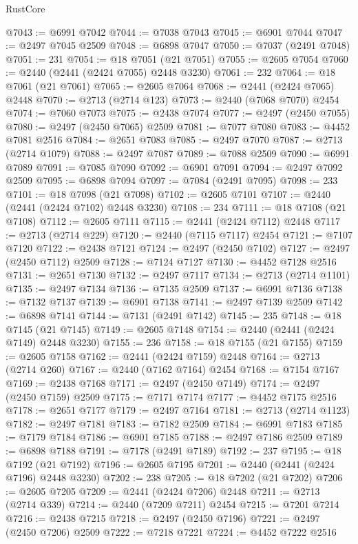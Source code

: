 \begin{lexlean}{RustCore}
\begin{coremodule}
@7043 := @6991 @7042
@7044 := @7038 @7043
@7045 := @6901 @7044
@7047 := @2497 @7045 @2509
@7048 := @6898 @7047
@7050 := @7037 (@2491 @7048)
@7051 := 231
@7054 := @18 @7051 (@21 @7051)
@7055 := @2605 @7054
@7060 := @2440 (@2441 (@2424 @7055) @2448 @3230)
@7061 := 232
@7064 := @18 @7061 (@21 @7061)
@7065 := @2605 @7064
@7068 := @2441 (@2424 @7065) @2448
@7070 := @2713 (@2714 @123)
@7073 := @2440 (@7068 @7070) @2454
@7074 := @7060 @7073
@7075 := @2438 @7074
@7077 := @2497 (@2450 @7055)
@7080 := @2497 (@2450 @7065) @2509
@7081 := @7077 @7080
@7083 := @4452 @7081 @2516
@7084 := @2651 @7083
@7085 := @2497 @7070
@7087 := @2713 (@2714 @1079)
@7088 := @2497 @7087
@7089 := @7088 @2509
@7090 := @6991 @7089
@7091 := @7085 @7090
@7092 := @6901 @7091
@7094 := @2497 @7092 @2509
@7095 := @6898 @7094
@7097 := @7084 (@2491 @7095)
@7098 := 233
@7101 := @18 @7098 (@21 @7098)
@7102 := @2605 @7101
@7107 := @2440 (@2441 (@2424 @7102) @2448 @3230)
@7108 := 234
@7111 := @18 @7108 (@21 @7108)
@7112 := @2605 @7111
@7115 := @2441 (@2424 @7112) @2448
@7117 := @2713 (@2714 @229)
@7120 := @2440 (@7115 @7117) @2454
@7121 := @7107 @7120
@7122 := @2438 @7121
@7124 := @2497 (@2450 @7102)
@7127 := @2497 (@2450 @7112) @2509
@7128 := @7124 @7127
@7130 := @4452 @7128 @2516
@7131 := @2651 @7130
@7132 := @2497 @7117
@7134 := @2713 (@2714 @1101)
@7135 := @2497 @7134
@7136 := @7135 @2509
@7137 := @6991 @7136
@7138 := @7132 @7137
@7139 := @6901 @7138
@7141 := @2497 @7139 @2509
@7142 := @6898 @7141
@7144 := @7131 (@2491 @7142)
@7145 := 235
@7148 := @18 @7145 (@21 @7145)
@7149 := @2605 @7148
@7154 := @2440 (@2441 (@2424 @7149) @2448 @3230)
@7155 := 236
@7158 := @18 @7155 (@21 @7155)
@7159 := @2605 @7158
@7162 := @2441 (@2424 @7159) @2448
@7164 := @2713 (@2714 @260)
@7167 := @2440 (@7162 @7164) @2454
@7168 := @7154 @7167
@7169 := @2438 @7168
@7171 := @2497 (@2450 @7149)
@7174 := @2497 (@2450 @7159) @2509
@7175 := @7171 @7174
@7177 := @4452 @7175 @2516
@7178 := @2651 @7177
@7179 := @2497 @7164
@7181 := @2713 (@2714 @1123)
@7182 := @2497 @7181
@7183 := @7182 @2509
@7184 := @6991 @7183
@7185 := @7179 @7184
@7186 := @6901 @7185
@7188 := @2497 @7186 @2509
@7189 := @6898 @7188
@7191 := @7178 (@2491 @7189)
@7192 := 237
@7195 := @18 @7192 (@21 @7192)
@7196 := @2605 @7195
@7201 := @2440 (@2441 (@2424 @7196) @2448 @3230)
@7202 := 238
@7205 := @18 @7202 (@21 @7202)
@7206 := @2605 @7205
@7209 := @2441 (@2424 @7206) @2448
@7211 := @2713 (@2714 @339)
@7214 := @2440 (@7209 @7211) @2454
@7215 := @7201 @7214
@7216 := @2438 @7215
@7218 := @2497 (@2450 @7196)
@7221 := @2497 (@2450 @7206) @2509
@7222 := @7218 @7221
@7224 := @4452 @7222 @2516

\end{coremodule}
\end{lexlean}
